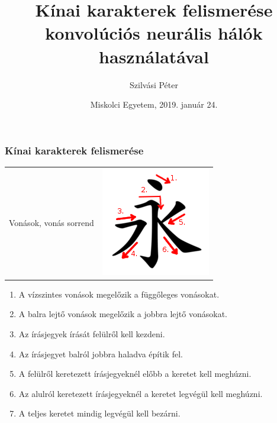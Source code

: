 \documentclass{beamer}
\begin{document}

\title[Kínai karakterek felismerése, konvolúciós ANN]{
{\Large Kínai karakterek felismerése konvolúciós neurális
hálók használatával}
}
\author[Szilvási Péter]{\Large Szilvási Péter}
\date{Miskolci Egyetem, 2019. január 24.}

\frame{\titlepage}

\begin{frame}[fragile]
\frametitle{Kínai karakterek felismerése}

\begin{tabular}{c c}
{\large Vonások, vonás sorrend} & 
\includegraphics[scale=0.3, center]{vonasrend_ordered}
\end{tabular}

\begin{enumerate}
\item A vízszintes vonások megelőzik a függőleges vonásokat.
\item A balra lejtő vonások megelőzik a jobbra lejtő vonásokat.
\item Az írásjegyek írását felülről kell kezdeni.
\item Az írásjegyet balról jobbra haladva építik fel.
\item A felülről keretezett írásjegyeknél előbb a keretet kell meghúzni.
\item Az alulról keretezett írásjegyeknél a keretet legvégül kell meghúzni.
\item A teljes keretet mindig legvégül kell bezárni.
\end{enumerate}

\end{frame}
\end{document}
